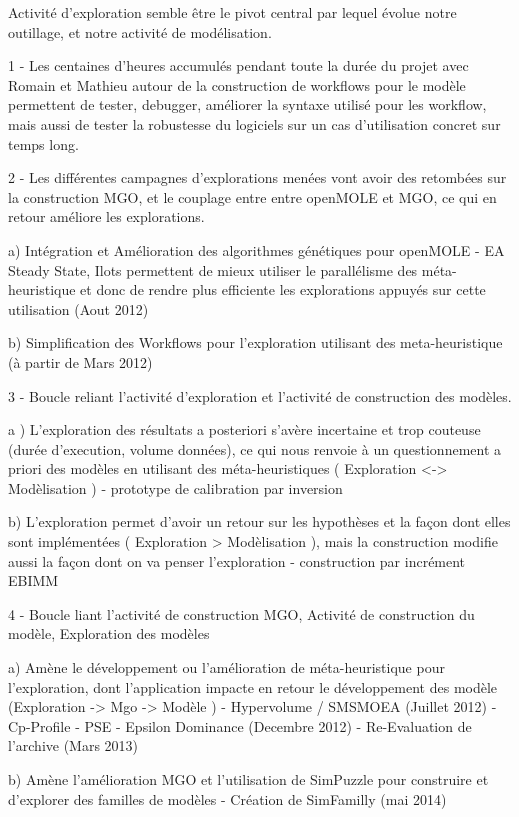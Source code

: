 Activité d'exploration semble être le pivot central par lequel évolue notre outillage, et notre activité de modélisation.

1 - Les centaines d'heures accumulés pendant toute la durée du projet avec Romain et Mathieu autour de la construction de workflows pour le modèle permettent de tester, debugger, améliorer la syntaxe utilisé pour les workflow, mais aussi de tester la robustesse du logiciels sur un cas d'utilisation concret sur temps long.

2 - Les différentes campagnes d'explorations menées vont avoir des retombées sur la construction MGO, et le couplage entre entre openMOLE et MGO, ce qui en retour améliore les explorations.

	a) Intégration et Amélioration des algorithmes génétiques pour openMOLE
		- EA Steady State, Ilots permettent de mieux utiliser le parallélisme des méta-heuristique et donc de rendre plus efficiente les explorations appuyés sur cette utilisation (Aout 2012) 

	b) Simplification des Workflows pour l'exploration utilisant des meta-heuristique (à partir de Mars 2012)

3 - Boucle reliant l'activité d'exploration et l'activité de construction des modèles. 

	a ) L'exploration des résultats a posteriori s'avère incertaine et trop couteuse (durée d'execution, volume données), ce qui nous renvoie à un questionnement a priori des modèles en utilisant des méta-heuristiques ( Exploration <-> Modèlisation )
		- prototype de calibration par inversion \autocite{Schmitt2015}

	b) L'exploration permet d'avoir un retour sur les hypothèses et la façon dont elles sont implémentées ( Exploration > Modèlisation ), mais la construction modifie aussi la façon dont on va penser l'exploration
		- construction par incrément EBIMM
		

4 - Boucle liant l'activité de construction MGO, Activité de construction du modèle, Exploration des modèles

	a) Amène le développement ou l'amélioration de méta-heuristique pour l'exploration, dont l'application impacte en retour le développement des modèle (Exploration -> Mgo -> Modèle )
	- Hypervolume / SMSMOEA (Juillet 2012) \autocite{Schmitt2015} 
	- Cp-Profile \autocite{Reuillon2015} 
	- PSE \autocite{Cherel2015}
	- Epsilon Dominance (Decembre 2012)
	- Re-Evaluation de l'archive (Mars 2013)

	b) Amène l'amélioration MGO et l'utilisation de SimPuzzle pour construire et d'explorer des familles de modèles
		- Création de SimFamilly (mai 2014)

